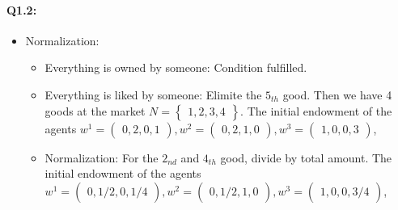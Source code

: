 \documentclass{article}
\newenvironment{answer}{\par\color{ForestGreen}}{\par}
\begin{document}
\begin{answer}
  \paragraph{Q1.2:}
  \begin{itemize}
    \item Normalization:
    \begin{itemize}
      \item Everything is owned by someone: Condition fulfilled.
      \item Everything is liked by someone: Elimite the $5_{th}$ good.
      Then we have 4 goods at the market $ N = \begin{Bmatrix} 1,2,3,4 \end{Bmatrix}$.
      The initial endowment of the agents
      $ w^1 = \begin{pmatrix} 0, 2, 0, 1 \end{pmatrix},
      w^2 = \begin{pmatrix} 0, 2, 1, 0 \end{pmatrix},
      w^3 = \begin{pmatrix} 1, 0, 0, 3 \end{pmatrix}$,
      \item Normalization: For the $2_{nd}$ and $4_{th}$ good, divide by total amount.
      The initial endowment of the agents
      $ w^1 = \begin{pmatrix} 0, 1/2, 0, 1/4 \end{pmatrix},
      w^2 = \begin{pmatrix} 0, 1/2, 1, 0 \end{pmatrix},
      w^3 = \begin{pmatrix} 1, 0, 0, 3/4 \end{pmatrix}$,
    \end{itemize}


\end{itemize}
\end{answer}
\end{document}
